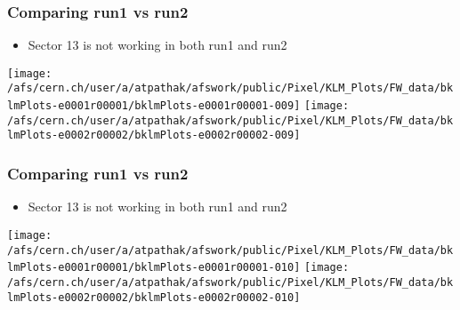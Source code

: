 \documentclass{beamer}
\begin{document}
\begin{frame}
\frametitle{Comparing run1 vs run2}
\vspace*{.05cm}

\begin{itemize} 
\item {\small Sector 13 is not working in both run1 and run2}
\end{itemize}

\begin{center}
\begin{normalsize}

\vspace*{-.2cm}
\begin{center}

\texttt{[image: /afs/cern.ch/user/a/atpathak/afswork/public/Pixel/KLM\_Plots/FW\_data/bklmPlots-e0001r00001/bklmPlots-e0001r00001-009]}
\texttt{[image: /afs/cern.ch/user/a/atpathak/afswork/public/Pixel/KLM\_Plots/FW\_data/bklmPlots-e0002r00002/bklmPlots-e0002r00002-009]} \\

\end{center}
\end{normalsize}
\end{center}
\end{frame}
\begin{frame}
\frametitle{Comparing run1 vs run2}
\vspace*{.05cm}

\begin{itemize} 
\item {\small Sector 13 is not working in both run1 and run2}
\end{itemize}

\begin{center}
\begin{normalsize}

\vspace*{-.2cm}
\begin{center}

\texttt{[image: /afs/cern.ch/user/a/atpathak/afswork/public/Pixel/KLM\_Plots/FW\_data/bklmPlots-e0001r00001/bklmPlots-e0001r00001-010]}
\texttt{[image: /afs/cern.ch/user/a/atpathak/afswork/public/Pixel/KLM\_Plots/FW\_data/bklmPlots-e0002r00002/bklmPlots-e0002r00002-010]} \\

\end{center}
\end{normalsize}
\end{center}
\end{frame}
\end{document}

